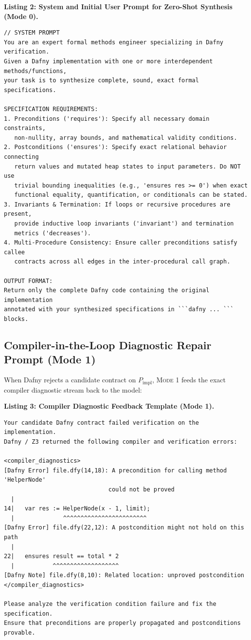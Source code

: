 \documentclass{article}
\begin{document}
\vspace{0.3em}
\noindent\textbf{Listing 2: System and Initial User Prompt for Zero-Shot Synthesis (Mode 0).}
{\footnotesize
\begin{verbatim}
// SYSTEM PROMPT
You are an expert formal methods engineer specializing in Dafny verification.
Given a Dafny implementation with one or more interdependent methods/functions,
your task is to synthesize complete, sound, exact formal specifications.

SPECIFICATION REQUIREMENTS:
1. Preconditions ('requires'): Specify all necessary domain constraints,
   non-nullity, array bounds, and mathematical validity conditions.
2. Postconditions ('ensures'): Specify exact relational behavior connecting
   return values and mutated heap states to input parameters. Do NOT use
   trivial bounding inequalities (e.g., 'ensures res >= 0') when exact
   functional equality, quantification, or conditionals can be stated.
3. Invariants & Termination: If loops or recursive procedures are present,
   provide inductive loop invariants ('invariant') and termination
   metrics ('decreases').
4. Multi-Procedure Consistency: Ensure caller preconditions satisfy callee
   contracts across all edges in the inter-procedural call graph.

OUTPUT FORMAT:
Return only the complete Dafny code containing the original implementation
annotated with your synthesized specifications in ```dafny ... ``` blocks.
\end{verbatim}
}

\subsection{Compiler-in-the-Loop Diagnostic Repair Prompt (Mode 1)}
\label{app:prompt_mode1}

When Dafny rejects a candidate contract on $P_{\text{impl}}$, \textsc{Mode 1} feeds the exact compiler diagnostic stream back to the model:

\vspace{0.3em}
\noindent\textbf{Listing 3: Compiler Diagnostic Feedback Template (Mode 1).}
{\footnotesize
\begin{verbatim}
Your candidate Dafny contract failed verification on the implementation.
Dafny / Z3 returned the following compiler and verification errors:

<compiler_diagnostics>
[Dafny Error] file.dfy(14,18): A precondition for calling method 'HelperNode'
                              could not be proved
  |
14|   var res := HelperNode(x - 1, limit);
  |              ^^^^^^^^^^^^^^^^^^^^^^^^
[Dafny Error] file.dfy(22,12): A postcondition might not hold on this path
  |
22|   ensures result == total * 2
  |           ^^^^^^^^^^^^^^^^^^^
[Dafny Note] file.dfy(8,10): Related location: unproved postcondition
</compiler_diagnostics>

Please analyze the verification condition failure and fix the specification.
Ensure that preconditions are properly propagated and postconditions provable.
\end{verbatim}
}
\end{document}
